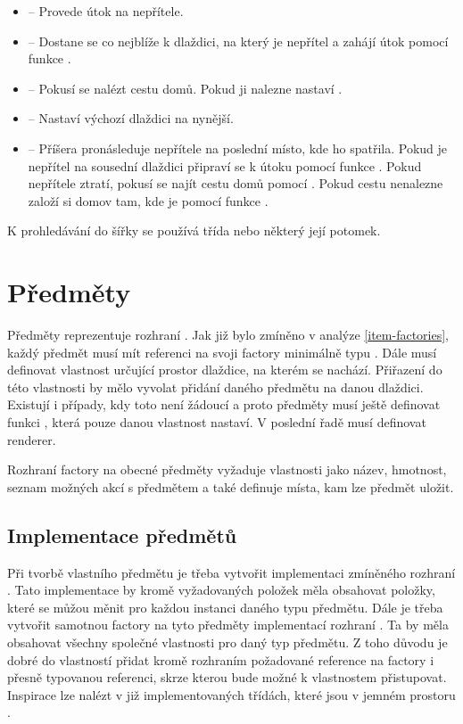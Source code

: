 \begin{itemize}
\item {} -- Provede útok na nepřítele.

\item {} -- Dostane se co nejblíže k dlaždici, na který je nepřítel a zahájí útok pomocí funkce .

\item {} -- Pokusí se nalézt cestu domů. Pokud ji nalezne nastaví .

\item {} -- Nastaví výchozí dlaždici na nynější.

\item {} -- Příšera pronásleduje nepřítele na poslední místo, kde ho spatřila. Pokud je nepřítel na sousední dlaždici připraví
se k útoku pomocí funkce . Pokud nepřítele ztratí, pokusí se najít cestu domů pomocí . Pokud
cestu nenalezne založí si domov tam, kde je pomocí funkce .

\end{itemize}

K prohledávání do šířky se používá třída  nebo některý její potomek. 

\section{Předměty}
Předměty reprezentuje rozhraní . Jak již bylo zmíněno v analýze \vref{item-factories}, každý předmět musí mít referenci na svoji 
factory minimálně typu . Dále musí definovat vlastnost  určující prostor dlaždice, na kterém se nachází. 
Přiřazení do této vlastnosti by mělo vyvolat přidání daného předmětu na danou dlaždici. Existují i případy, kdy toto není 
žádoucí a proto předměty musí ještě definovat funkci , která pouze danou vlastnost nastaví. V poslední řadě musí definovat renderer.

Rozhraní factory na obecné předměty vyžaduje vlastnosti jako název, hmotnost, seznam 
možných akcí s předmětem a také definuje místa, kam lze předmět uložit.

\subsection{Implementace předmětů}
Při tvorbě vlastního předmětu je třeba vytvořit implementaci zmíněného rozhraní . Tato implementace by 
kromě vyžadovaných položek měla obsahovat položky, které se můžou měnit pro každou instanci daného typu předmětu. 
Dále je třeba vytvořit samotnou factory na tyto předměty implementací rozhraní .
Ta by měla obsahovat všechny společné vlastnosti pro daný typ předmětu. Z toho  důvodu je dobré do vlastností 
přidat kromě rozhraním požadované reference na factory i přesně typovanou referenci, skrze kterou bude možné k 
vlastnostem přistupovat. Inspirace lze nalézt v již implementovaných třídách, které jsou v jemném 
prostoru .

